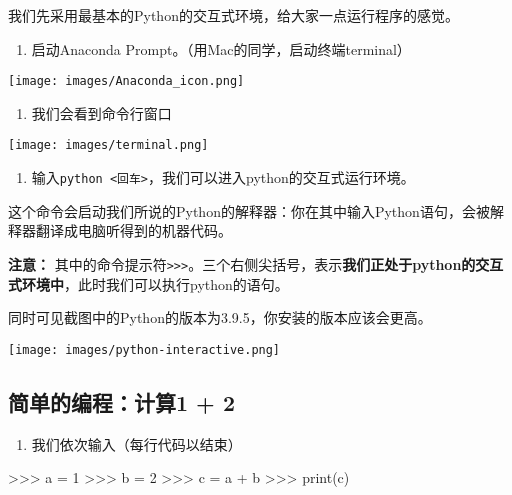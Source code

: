\documentclass[
  letterpaper,
  DIV=11,
  numbers=noendperiod]{scrreprt}
\newenvironment{Shaded}{\begin{snugshade}}{\end{snugshade}}
\newcommand{\BuiltInTok}[1]{\textcolor[rgb]{0.00,0.23,0.31}{#1}}
\newcommand{\DecValTok}[1]{\textcolor[rgb]{0.68,0.00,0.00}{#1}}
\newcommand{\NormalTok}[1]{\textcolor[rgb]{0.00,0.23,0.31}{#1}}
\newcommand{\OperatorTok}[1]{\textcolor[rgb]{0.37,0.37,0.37}{#1}}
\providecommand{\tightlist}{%
  \setlength{\itemsep}{0pt}\setlength{\parskip}{0pt}}\usepackage{longtable,booktabs,array}
\begin{document}
我们先采用最基本的Python的交互式环境，给大家一点运行程序的感觉。

\begin{enumerate}
\def\labelenumi{\arabic{enumi}.}
\tightlist
\item
  启动Anaconda Prompt。（用Mac的同学，启动终端terminal）
\end{enumerate}

\texttt{[image: images/Anaconda\_icon.png]}

\begin{enumerate}
\def\labelenumi{\arabic{enumi}.}
\setcounter{enumi}{1}
\tightlist
\item
  我们会看到命令行窗口
\end{enumerate}

\texttt{[image: images/terminal.png]}

\begin{enumerate}
\def\labelenumi{\arabic{enumi}.}
\setcounter{enumi}{2}
\tightlist
\item
  输入\texttt{python\ \textless{}回车\textgreater{}}，我们可以进入python的交互式运行环境。
\end{enumerate}

这个命令会启动我们所说的Python的解释器：你在其中输入Python语句，会被解释器翻译成电脑听得到的机器代码。

{\textbf{注意：}}
其中的命令提示符\texttt{\textgreater{}\textgreater{}\textgreater{}}。三个右侧尖括号，表示\textbf{我们正处于python的交互式环境中}，此时我们可以执行python的语句。

同时可见截图中的Python的版本为3.9.5，你安装的版本应该会更高。

\texttt{[image: images/python-interactive.png]}

\hypertarget{ux7b80ux5355ux7684ux7f16ux7a0bux8ba1ux7b971-2}{%
\subsection{简单的编程：计算1 +
2}\label{ux7b80ux5355ux7684ux7f16ux7a0bux8ba1ux7b971-2}}

\begin{enumerate}
\def\labelenumi{\arabic{enumi}.}
\tightlist
\item
  我们依次输入（每行代码以结束）
\end{enumerate}

\begin{Shaded}
\begin{Highlighting}[]
\OperatorTok{\textgreater{}\textgreater{}\textgreater{}}\NormalTok{ a }\OperatorTok{=} \DecValTok{1}
\OperatorTok{\textgreater{}\textgreater{}\textgreater{}}\NormalTok{ b }\OperatorTok{=} \DecValTok{2}
\OperatorTok{\textgreater{}\textgreater{}\textgreater{}}\NormalTok{ c }\OperatorTok{=}\NormalTok{ a }\OperatorTok{+}\NormalTok{ b }
\OperatorTok{\textgreater{}\textgreater{}\textgreater{}} \BuiltInTok{print}\NormalTok{(c)}
\end{Highlighting}
\end{Shaded}
\end{document}
